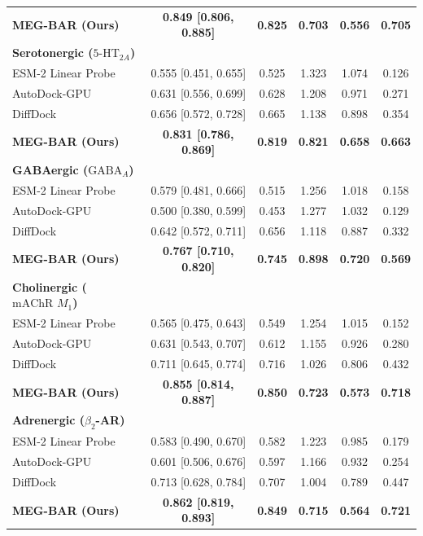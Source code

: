 \documentclass{article}
\theoremstyle{definition}
\begin{document}
\begin{table}[t]
{\begin{tabular}{l c c c c c}
\quad \textbf{MEG-BAR (Ours)} & \textbf{0.849 [0.806, 0.885]} & \textbf{0.825} & \textbf{0.703} & \textbf{0.556} & \textbf{0.705} \\
\textbf{Serotonergic ($5\text{-HT}_{2A}$)} & & & & & \\
\quad ESM-2 Linear Probe & 0.555 [0.451, 0.655] & 0.525 & 1.323 & 1.074 & 0.126 \\
\quad AutoDock-GPU & 0.631 [0.556, 0.699] & 0.628 & 1.208 & 0.971 & 0.271 \\
\quad DiffDock & 0.656 [0.572, 0.728] & 0.665 & 1.138 & 0.898 & 0.354 \\
\quad \textbf{MEG-BAR (Ours)} & \textbf{0.831 [0.786, 0.869]} & \textbf{0.819} & \textbf{0.821} & \textbf{0.658} & \textbf{0.663} \\
\textbf{GABAergic ($\text{GABA}_A$)} & & & & & \\
\quad ESM-2 Linear Probe & 0.579 [0.481, 0.666] & 0.515 & 1.256 & 1.018 & 0.158 \\
\quad AutoDock-GPU & 0.500 [0.380, 0.599] & 0.453 & 1.277 & 1.032 & 0.129 \\
\quad DiffDock & 0.642 [0.572, 0.711] & 0.656 & 1.118 & 0.887 & 0.332 \\
\quad \textbf{MEG-BAR (Ours)} & \textbf{0.767 [0.710, 0.820]} & \textbf{0.745} & \textbf{0.898} & \textbf{0.720} & \textbf{0.569} \\
\textbf{Cholinergic ($\text{mAChR } M_1$)} & & & & & \\
\quad ESM-2 Linear Probe & 0.565 [0.475, 0.643] & 0.549 & 1.254 & 1.015 & 0.152 \\
\quad AutoDock-GPU & 0.631 [0.543, 0.707] & 0.612 & 1.155 & 0.926 & 0.280 \\
\quad DiffDock & 0.711 [0.645, 0.774] & 0.716 & 1.026 & 0.806 & 0.432 \\
\quad \textbf{MEG-BAR (Ours)} & \textbf{0.855 [0.814, 0.887]} & \textbf{0.850} & \textbf{0.723} & \textbf{0.573} & \textbf{0.718} \\
\textbf{Adrenergic ($\beta_2$-AR)} & & & & & \\
\quad ESM-2 Linear Probe & 0.583 [0.490, 0.670] & 0.582 & 1.223 & 0.985 & 0.179 \\
\quad AutoDock-GPU & 0.601 [0.506, 0.676] & 0.597 & 1.166 & 0.932 & 0.254 \\
\quad DiffDock & 0.713 [0.628, 0.784] & 0.707 & 1.004 & 0.789 & 0.447 \\
\quad \textbf{MEG-BAR (Ours)} & \textbf{0.862 [0.819, 0.893]} & \textbf{0.849} & \textbf{0.715} & \textbf{0.564} & \textbf{0.721} \\
\bottomrule
\end{tabular}%
}
\end{table}
\end{document}
